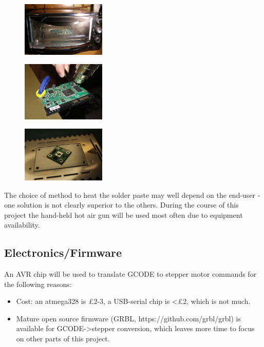 \begin{figure}
\centering
\begin{minipage}{.3\textwidth}
	\centering
	\includegraphics[width=40mm]{resources/boardintheoven.jpg}
	\label{toasteroven}
\end{minipage}%
\hfill
\begin{minipage}{.3\textwidth}
	\centering
	\includegraphics[width=40mm]{resources/hotair_demo.jpg}
	\label{hotairdemo}
\end{minipage}%
\hfill
\begin{minipage}{.3\textwidth}
	\centering
	\includegraphics[width=40mm]{resources/hotplate.jpg}
	\label{hotplate}
\end{minipage}
\end{figure}	
			
The choice of method to heat the solder paste may well depend on the end-user - one solution is not clearly superior to the others. During the
course of this project the hand-held hot air gun will be used most often due to equipment availability.

\subsection{Electronics/Firmware}
An AVR chip will be used to translate GCODE to stepper motor commands for the following reasons:

\begin{itemize} \itemsep0em
	\item	Cost: an atmega328 is \pounds 2-3, a USB-serial chip is \textless \pounds 2, which is not much.
	\item	Mature open source firmware (GRBL, https://github.com/grbl/grbl) is available for GCODE-\textgreater stepper
		conversion, which leaves more time to focus on other parts of this project.
\end{itemize}

